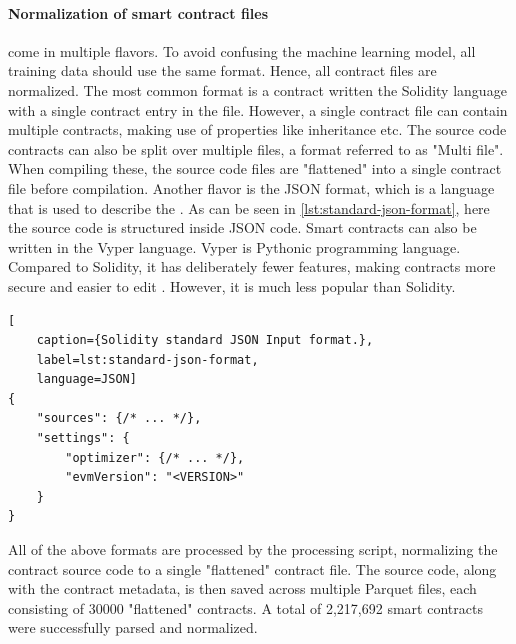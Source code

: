 \paragraph{Normalization of smart contract files}
\label{par:normalization}
 come in multiple flavors. To avoid confusing the machine learning model, all training data should use the same format. Hence, all contract files are normalized. The most common format is a contract written the Solidity language with a single contract entry in the file. However, a single contract file can contain multiple contracts, making use of properties like inheritance etc. The source code contracts can also be split over multiple files, a format referred to as "Multi file". When compiling these, the source code files are "flattened" into a single contract file before compilation. Another flavor is the JSON format, which is a language that is used to describe the . As can be seen in \cref{lst:standard-json-format}, here the source code is structured inside JSON code. Smart contracts can also be written in the Vyper language. Vyper is Pythonic programming language. Compared to Solidity, it has deliberately fewer features, making contracts more secure and easier to edit \cite{vyper}. However, it is much less popular than Solidity.

\begin{lstlisting}[
    caption={Solidity standard JSON Input format.},
    label=lst:standard-json-format,
    language=JSON]
{
    "sources": {/* ... */},
    "settings": {
        "optimizer": {/* ... */},
        "evmVersion": "<VERSION>"
    }
}
\end{lstlisting}

All of the above formats are processed by the processing script, normalizing the contract source code to a single "flattened" contract file. The source code, along with the contract metadata, is then saved across multiple Parquet files, each consisting of 30000 "flattened" contracts. A total of 2,217,692 smart contracts were successfully parsed and normalized.

